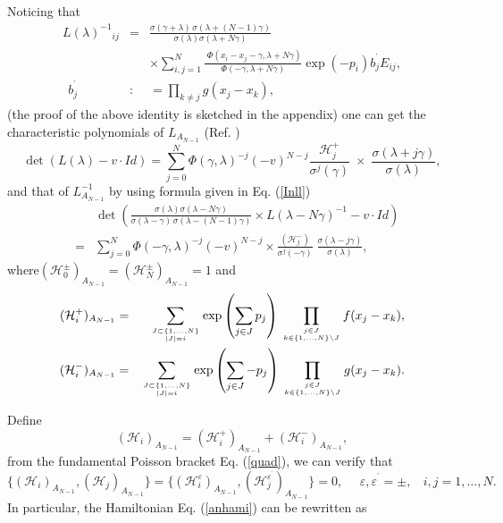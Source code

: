 \documentclass[a4paper,12pt]{article}
\def\QATOP#1#2{{#1 \atop #2}}
\begin{document}
Noticing that
\begin{eqnarray}
L(\lambda )^{-1}{}_{ij} &=&\frac{\sigma (\gamma +\lambda
)\,\sigma (\lambda +(N-1)\gamma )}{\sigma (\lambda )\sigma
(\lambda +N\gamma )}  \nonumber \\ &&\times
\sum_{i,j=1}^{N}\frac{\;\Phi (x_{i}-x_{j}-\gamma ,\lambda
+N\gamma ) }{\Phi (-\gamma ,\lambda +N\gamma )}\mathrm{\exp
}(-p_{i})b_{j}^{^{\prime }}E_{ij},  \label{laxinverse} \\
\mbox{$\ \ $}b_{j}^{^{\prime }} &:&=\prod_{k\neq j}g(x_{j}-x_{k}),
\end{eqnarray}
(the proof of the above identity is sketched in the
appendix) one can get the characteristic polynomials of $L_{A_{N-1}}$
(Ref. \cite{r3})
\begin{equation}
\det (L(\lambda )-v\cdot Id)=\sum_{j=0}^{N}\Phi (\gamma ,\lambda
)^{-j}(-v)^{N-j}\frac{\mathcal{H}_{j}^{+}}{\sigma
^{j}(\gamma )}\;\times \;
\frac{\sigma (\lambda +j\gamma )}{\sigma (\lambda )},  \label{poly}
\end{equation}
and that of $L_{A_{N-1}}^{-1}$ by using formula given in Eq.
(\ref{Inll})
\begin{eqnarray}
&&\det (\frac{\sigma (\lambda )\sigma (\lambda -N\gamma
)}{\sigma (\lambda
-\gamma )\,\sigma (\lambda -(N-1)\gamma )}\times L(\lambda -N\gamma
)^{-1}-v\cdot Id)  \nonumber \\ &=&\sum_{j=0}^{N}\Phi
(-\gamma ,\lambda )^{-j}(-v)^{N-j}\times \frac{(
\mathcal{H}_{j}^{-})}{\sigma ^{j}(-\gamma )}\;\frac{\sigma (\lambda -j\gamma
)}{\sigma (\lambda )},	\label{Ipoly}
\end{eqnarray}
where$(\mathcal{H}_{0}^{\pm
})_{A_{N-1}}=(\mathcal{H}_{N}^{\pm })_{A_{N-1}}=1 $ and
\begin{eqnarray}
(\mathcal{H}_{i}^{+})_{A_{N-1}}
&=&\sum_{\QATOP{J\subset \{1,\ldots ,N\} }{\left| J\right|
=i}}\exp \left(
\sum_{j\in J}p_{j}\right) \,\prod_{\QATOP{j\in J }{k\in \{1,\ldots
,N\}\setminus J}}f(x_{j}-x_{k}), \\
(\mathcal{H}_{i}^{-})_{A_{N-1}}
&=&\sum_{\QATOP{J\subset \{1,\ldots ,N\} }{\left| J\right|
=i}}\exp \left(
\sum_{j\in J}-p_{j}\right) \,\prod_{\QATOP{j\in J }{k\in \{1,\ldots
,N\}\setminus J}}g(x_{j}-x_{k}).
\end{eqnarray}

Define
\begin{equation}
(\mathcal{H}_{i})_{A_{N-1}}=(\mathcal{H}_{i}^{+})_{A_{N-1}}+(\mathcal{H}
_{i}^{-})_{A_{N-1}},  \label{hamiset}
\end{equation}
from the fundamental Poisson bracket Eq. (\ref{quad}), we can
verify that
\begin{equation}
\{(\mathcal{H}_{i})_{A_{N-1}},(\mathcal{H}_{j})_{A_{N-1}}\}=\{(\mathcal{H}
_{i}^{\varepsilon })_{A_{N-1}},(\mathcal{H}_{j}^{\varepsilon ^{^{\prime
}}})_{A_{N-1}}\}=0,\ \ \ \ \ \ \varepsilon ,\varepsilon
^{^{\prime }}=\pm ,\
\ \ \ i,j=1,\ldots ,N.	\label{aninv}
\end{equation}
In particular, the Hamiltonian Eq. (\ref{anhami}) can be
rewritten as
\end{document}
